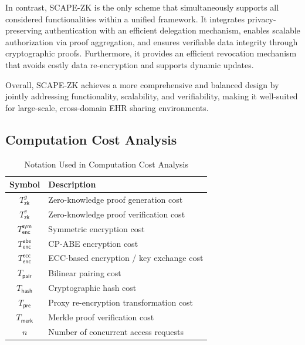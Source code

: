 \documentclass[conference]{IEEEtran}
\begin{document}
In contrast, SCAPE-ZK is the only scheme that simultaneously supports all considered functionalities within a unified framework. It integrates privacy-preserving authentication with an efficient delegation mechanism, enables scalable authorization via proof aggregation, and ensures verifiable data integrity through cryptographic proofs. Furthermore, it provides an efficient revocation mechanism that avoids costly data re-encryption and supports dynamic updates.

Overall, SCAPE-ZK achieves a more comprehensive and balanced design by jointly addressing functionality, scalability, and verifiability, making it well-suited for large-scale, cross-domain EHR sharing environments.

\subsection{Computation Cost Analysis}
\begin{table}[t]
\centering
\caption{Notation Used in Computation Cost Analysis}
\label{tab:cost-notation}
\begin{tabular}{c|l}
\hline
Symbol & Description \\
\hline
$T_{\mathsf{zk}}^{g}$ & Zero-knowledge proof generation cost \\
$T_{\mathsf{zk}}^{v}$ & Zero-knowledge proof verification cost \\
$T_{\mathsf{enc}}^{\mathsf{sym}}$ & Symmetric encryption cost \\
$T_{\mathsf{enc}}^{\mathsf{abe}}$ & CP-ABE encryption cost \\
$T_{\mathsf{enc}}^{\mathsf{ecc}}$ & ECC-based encryption / key exchange cost \\
$T_{\mathsf{pair}}$ & Bilinear pairing cost \\
$T_{\mathsf{hash}}$ & Cryptographic hash cost \\
$T_{\mathsf{pre}}$ & Proxy re-encryption transformation cost \\
$T_{\mathsf{merk}}$ & Merkle proof verification cost \\
$n$ & Number of concurrent access requests \\
\hline
\end{tabular}
\end{table}
\end{document}
